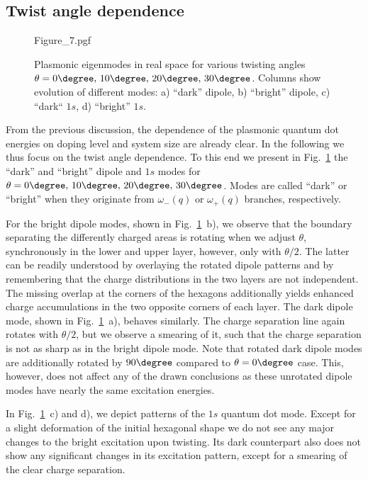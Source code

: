 \subsection{Twist angle dependence}

\begin{figure}
    \centering
    {Figure_7.pgf}
    \caption{Plasmonic eigenmodes in real space for various twisting angles $\theta=0\degree,\,10\degree,\,20\degree,\,30\degree$. Columns show evolution of different modes: a) ``dark'' dipole, b) ``bright'' dipole, c) ``dark`` $1s$, d) ``bright'' $1s$.}
    \label{fig:mat22:modesTheta}
\end{figure}

From the previous discussion, the dependence of the plasmonic quantum dot energies on doping level and system size are already clear. In the following we thus focus on the twist angle dependence. To this end we present in Fig.~\ref{fig:mat22:modesTheta} the ``dark'' and ``bright'' dipole and $1s$ modes for $\theta=0\degree, \,10\degree, \,20\degree, \,30\degree$. Modes are called ``dark'' or ``bright'' when they originate from $\omega_-(q)$ or $\omega_+(q)$ branches, respectively.

For the bright dipole modes, shown in Fig.~\ref{fig:mat22:modesTheta}~b), we observe that the boundary separating the differently charged areas is rotating when we adjust $\theta$, synchronously in the lower and upper layer, however, only with $\theta/2$. The latter can be readily understood by overlaying the rotated dipole patterns and by remembering that the charge distributions in the two layers are not independent. The missing overlap at the corners of the hexagons additionally yields enhanced charge accumulations in the two opposite corners of each layer. The dark dipole mode, shown in Fig.~\ref{fig:mat22:modesTheta}~a), behaves similarly. The charge separation line again rotates with $\theta/2$, but we observe a smearing of it, such that the charge separation is not as sharp as in the bright dipole mode. Note that rotated dark dipole modes are additionally rotated by $90\degree$ compared to $\theta=0\degree$ case. This, however, does not affect any of the drawn conclusions as these unrotated dipole modes have nearly the same excitation energies.%

In Fig.~\ref{fig:mat22:modesTheta}~c) and d), we depict patterns of the $1s$ quantum dot mode. Except for a slight deformation of the initial hexagonal shape we do not see any major changes to the bright excitation upon twisting. Its dark counterpart also does not show any significant changes in its excitation pattern, except for a smearing of the clear charge separation.

